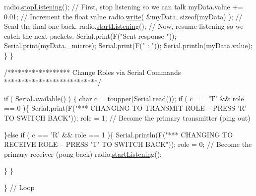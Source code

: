 \begin{DoxyCodeInclude}
      radio.\hyperlink{classRF24_a6f144d73fc447c8ac2d1a4166210fd88}{stopListening}();                               \textcolor{comment}{// First, stop listening so we can
       talk  }
      myData.value += 0.01;                                \textcolor{comment}{// Increment the float value}
      radio.\hyperlink{classRF24_a4cd4c198a47704db20b6b5cf0731cd58}{write}( &myData, \textcolor{keyword}{sizeof}(myData) );              \textcolor{comment}{// Send the final one back.      }
      radio.\hyperlink{classRF24_a30a2733a3889bdc331fe2d2f4f0f7b39}{startListening}();                              \textcolor{comment}{// Now, resume listening so we
       catch the next packets.     }
      Serial.print(F(\textcolor{stringliteral}{"Sent response "}));
      Serial.print(myData.\_micros);  
      Serial.print(F(\textcolor{stringliteral}{" : "}));
      Serial.println(myData.value);
   \}
 \}




\textcolor{comment}{/****************** Change Roles via Serial Commands ***************************/}

  \textcolor{keywordflow}{if} ( Serial.available() )
  \{
    \textcolor{keywordtype}{char} c = toupper(Serial.read());
    \textcolor{keywordflow}{if} ( c == \textcolor{charliteral}{'T'} && role == 0 )\{      
      Serial.print(F(\textcolor{stringliteral}{"*** CHANGING TO TRANSMIT ROLE -- PRESS 'R' TO SWITCH BACK"}));
      role = 1;                  \textcolor{comment}{// Become the primary transmitter (ping out)}
    
   \}\textcolor{keywordflow}{else}
    \textcolor{keywordflow}{if} ( c == \textcolor{charliteral}{'R'} && role == 1 )\{
      Serial.println(F(\textcolor{stringliteral}{"*** CHANGING TO RECEIVE ROLE -- PRESS 'T' TO SWITCH BACK"}));      
       role = 0;                \textcolor{comment}{// Become the primary receiver (pong back)}
       radio.\hyperlink{classRF24_a30a2733a3889bdc331fe2d2f4f0f7b39}{startListening}();
       
    \}
  \}


\} \textcolor{comment}{// Loop}
\end{DoxyCodeInclude}
 